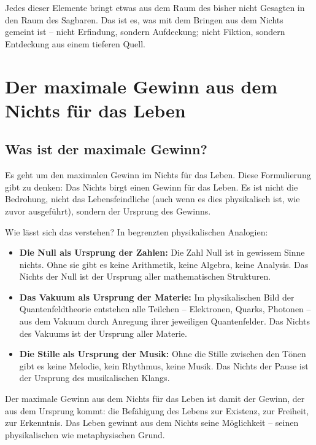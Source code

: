 ﻿\documentclass[12pt,a4paper]{report}
\begin{document}
Jedes dieser Elemente bringt etwas aus dem Raum des bisher nicht Gesagten in den Raum des Sagbaren. Das ist es, was mit dem \glqq Bringen aus dem Nichts\grqq{} gemeint ist -- nicht Erfindung, sondern Aufdeckung; nicht Fiktion, sondern Entdeckung aus einem tieferen Quell.

\section{Der maximale Gewinn aus dem Nichts für das Leben}

\subsection{Was ist der \flqq maximale Gewinn\frqq{}?}

Es geht um den maximalen Gewinn im Nichts für das Leben. Diese Formulierung gibt zu denken: Das Nichts birgt einen Gewinn für das Leben. Es ist nicht die Bedrohung, nicht das Lebensfeindliche (auch wenn es dies physikalisch ist, wie zuvor ausgeführt), sondern der Ursprung des Gewinns.

Wie lässt sich das verstehen? In begrenzten physikalischen Analogien:

\begin{itemize}
	\item \textbf{Die Null als Ursprung der Zahlen:} Die Zahl Null ist in gewissem Sinne \glqq nichts\grqq{}. Ohne sie gibt es keine Arithmetik, keine Algebra, keine Analysis. Das Nichts der Null ist der Ursprung aller mathematischen Strukturen.

	\item \textbf{Das Vakuum als Ursprung der Materie:} Im physikalischen Bild der Quantenfeldtheorie entstehen alle Teilchen -- Elektronen, Quarks, Photonen -- aus dem Vakuum durch Anregung ihrer jeweiligen Quantenfelder. Das Nichts des Vakuums ist der Ursprung aller Materie.

	\item \textbf{Die Stille als Ursprung der Musik:} Ohne die Stille zwischen den Tönen gibt es keine Melodie, kein Rhythmus, keine Musik. Das Nichts der Pause ist der Ursprung des musikalischen Klangs.
\end{itemize}

Der maximale Gewinn aus dem Nichts für das Leben ist damit der Gewinn, der aus dem Ursprung kommt: die Befähigung des Lebens zur Existenz, zur Freiheit, zur Erkenntnis. Das Leben gewinnt aus dem Nichts seine Möglichkeit -- seinen physikalischen wie metaphysischen Grund.
\end{document}
